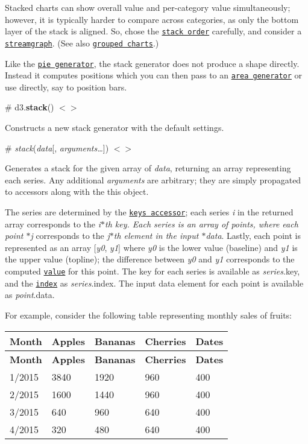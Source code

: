 Stacked charts can show overall value and per-\/category value simultaneously; however, it is typically harder to compare across categories, as only the bottom layer of the stack is aligned. So, chose the \href{#stack_order}{\tt stack order} carefully, and consider a \href{#stackOffsetWiggle}{\tt streamgraph}. (See also \href{http://bl.ocks.org/mbostock/3887051}{\tt grouped charts}.)

Like the \href{#pies}{\tt pie generator}, the stack generator does not produce a shape directly. Instead it computes positions which you can then pass to an \href{#areas}{\tt area generator} or use directly, say to position bars.

\label{_stack}%
\# d3.{\bfseries stack}() \href{https://github.com/d3/d3-shape/blob/master/src/stack.js}{\tt $<$$>$}

Constructs a new stack generator with the default settings.

\label{__stack}%
\# {\itshape stack}({\itshape data}\mbox{[}, {\itshape arguments…}\mbox{]}) \href{https://github.com/d3/d3-shape/blob/master/src/stack.js#L16}{\tt $<$$>$}

Generates a stack for the given array of {\itshape data}, returning an array representing each series. Any additional {\itshape arguments} are arbitrary; they are simply propagated to accessors along with the {\ttfamily this} object.

The series are determined by the \href{#stack_keys}{\tt keys accessor}; each series {\itshape i} in the returned array corresponds to the {\itshape i$\ast$th key. Each series is an array of points, where each point $\ast$j} corresponds to the {\itshape j$\ast$th element in the input $\ast$data}. Lastly, each point is represented as an array \mbox{[}{\itshape y0}, {\itshape y1}\mbox{]} where {\itshape y0} is the lower value (baseline) and {\itshape y1} is the upper value (topline); the difference between {\itshape y0} and {\itshape y1} corresponds to the computed \href{#stack_value}{\tt value} for this point. The key for each series is available as {\itshape series}.key, and the \href{#stack_order}{\tt index} as {\itshape series}.index. The input data element for each point is available as {\itshape point}.data.

For example, consider the following table representing monthly sales of fruits\+:

\tabulinesep=1mm
\begin{longtabu} spread 0pt [c]{*{5}{|X[-1]}|}
\hline
\rowcolor{\tableheadbgcolor}\textbf{ Month  }&\textbf{ Apples  }&\textbf{ Bananas  }&\textbf{ Cherries  }&\textbf{ Dates   }\\
\endfirsthead
\hline
\endfoot
\hline
\rowcolor{\tableheadbgcolor}\textbf{ Month  }&\textbf{ Apples  }&\textbf{ Bananas  }&\textbf{ Cherries  }&\textbf{ Dates   }\\
/2015  &3840  &1920  &960  &400   \\
2/2015  &1600  &1440  &960  &400   \\
3/2015  &640  &960  &640  &400   \\
4/2015  &320  &480  &640  &400   \\
\end{longtabu}


